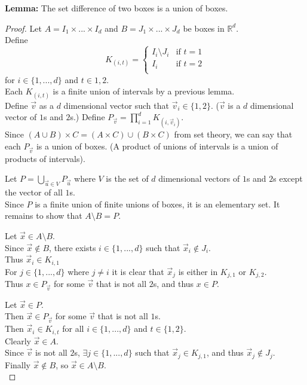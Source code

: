 \documentclass[12pt]{article}
\begin{document}
\textbf{Lemma:} The set difference of two boxes is a union of boxes.

\begin{proof}
	Let $A = I_{1} \times ... \times I_{d}$ and $B = J_{1} \times ... \times J_{d}$ be boxes in $\mathds{R}^{d}$. \\
	Define 
	\[ 
		K_{(i,t)} =
		\begin{cases} 
			I_{i} \setminus J_{i} & \text{if } t=1 \\
			I_{i} & \text{if } t=2 \\
		\end{cases}
	\]
	for $i \in \{1,...,d\}$ and $t \in {1,2}$.\\
	Each $K_{(i,t)}$ is a finite union of intervals by a previous lemma.\\
	Define $\vec{v}$ as a $d$ dimensional vector such that $\vec{v}_{i} \in \{1,2\}$. ($\vec{v}$ is a $d$ dimensional vector of $1$s and $2$s.)
	Define $P_{\vec{v}} = \prod\limits_{i=1}^{d} K_{(i,\vec{v}_{i})}$. \\
	Since $(A \cup B) \times C = (A \times C) \cup (B \times C)$ from set theory, we can say that each $P_{\vec{v}}$ is a union of boxes. (A product of unions of intervals is a union of products of intervals). \bigbreak
	
	Let $P = \bigcup\limits_{\vec{u} \in V} P_{\vec{u}}$ where $V$ is the set of $d$ dimensional vectors of $1$s and $2$s except the vector of all $1$s. \\
	Since $P$ is a finite union of finite unions of boxes, it is an elementary set. It remains to show that $A \setminus B = P$. \bigbreak
	
	Let $\vec{x} \in A \setminus B$. \\
	Since $\vec{x} \notin B$, there exists $i \in \{1,...,d\}$ such that $\vec{x}_{i} \notin J_{i}$. \\
	Thus $\vec{x}_{i} \in K_{i,1}$ \\
	For $j \in \{1,...,d\}$ where $j \neq i$ it is clear that $\vec{x}_{j}$ is either in $ K_{j,1}$ or $ K_{j,2}$. \\
	Thus $x \in P_{\vec{v}}$ for some $\vec{v}$ that is not all $2$s, and thus $x \in P$. \bigbreak 
	
	Let $\vec{x} \in P$. \\
	Then $\vec{x} \in P_{\vec{v}}$ for some $\vec{v}$ that is not all $1$s. \\
	Then $\vec{x}_{i} \in K_{i,t}$ for all $i \in \{1,...,d\}$ and $t \in \{1,2\}$. \\
	Clearly $\vec{x} \in A$. \\
	Since $\vec{v}$ is not all $2$s, $\exists j \in \{1,...,d\}$ such that $\vec{x}_{j} \in K_{j,1}$, and thus $\vec{x}_{j} \notin J_{j}$. \\
	Finally $\vec{x} \notin B$, so $\vec{x} \in A \setminus B$.	\\
\end{proof}
\end{document}
